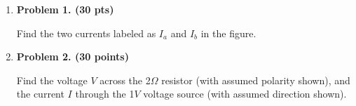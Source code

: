 \begin{enumerate}

\item {\bf Problem 1. (30 pts)}

  Find the two currents labeled as $I_a$ and $I_b$ in the figure.






\item {\bf Problem 2. (30 points)}

  Find the voltage $V$ across the 2$\Omega$ resistor (with assumed polarity shown),
  and the current $I$ through the 1$V$ voltage source (with assumed direction shown).






\end{enumerate}
